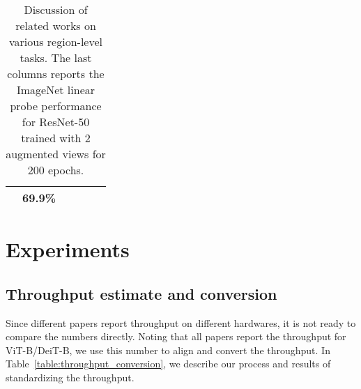 \documentclass{article} \usepackage{iclr2022_conference,times}
\begin{document}
\begin{table}[t!]
{\begin{tabular}{l | p{1.0cm} | p{2.8cm} | p{2.4cm} | p{2.8cm} | p{1.0cm}}
& {\bf 69.9\%} \\
    \bottomrule
  \end{tabular}
  }
  \vspace{1mm}
\caption{Discussion of related works on various region-level tasks. The last columns reports the ImageNet linear probe performance for ResNet-50 trained with 2 augmented views for 200 epochs.}
  \label{table:region_level_tasks}  
  \vspace{-2mm}
\end{table}


\section{Experiments}
\subsection{Throughput estimate and conversion}

Since different papers report throughput on different hardwares, it is not ready to compare the numbers directly. Noting that all papers report the throughput for ViT-B/DeiT-B, we use this number to align and convert the throughput. In Table~\ref{table:throughput_conversion}, we describe our process and results of standardizing the throughput.
\end{document}
